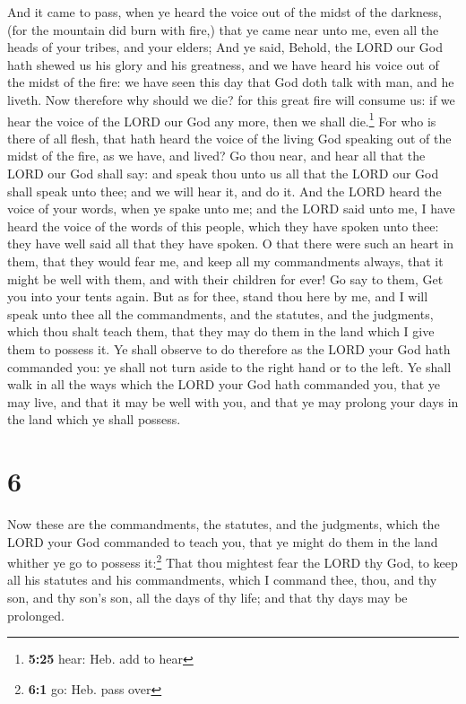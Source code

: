  And it came to pass, when ye heard the voice out of the
midst of the darkness, (for the mountain did burn with fire,) that ye
came near unto me, even all the heads of your tribes, and your elders;
 And ye said, Behold, the LORD our God hath shewed us his
glory and his greatness, and we have heard his voice out of the midst of
the fire: we have seen this day that God doth talk with man, and he
liveth.  Now therefore why should we die? for this great
fire will consume us: if we hear the voice of the LORD our God any more,
then we shall die.\footnote{\textbf{5:25} hear: Heb. add to hear}
 For who is there of all flesh, that hath heard the voice
of the living God speaking out of the midst of the fire, as we have, and
lived?  Go thou near, and hear all that the LORD our God
shall say: and speak thou unto us all that the LORD our God shall speak
unto thee; and we will hear it, and do it.  And the LORD
heard the voice of your words, when ye spake unto me; and the LORD said
unto me, I have heard the voice of the words of this people, which they
have spoken unto thee: they have well said all that they have spoken.
 O that there were such an heart in them, that they would
fear me, and keep all my commandments always, that it might be well with
them, and with their children for ever!  Go say to them,
Get you into your tents again.  But as for thee, stand
thou here by me, and I will speak unto thee all the commandments, and
the statutes, and the judgments, which thou shalt teach them, that they
may do them in the land which I give them to possess it. 
Ye shall observe to do therefore as the LORD your God hath commanded
you: ye shall not turn aside to the right hand or to the left.
 Ye shall walk in all the ways which the LORD your God
hath commanded you, that ye may live, and that it may be well with you,
and that ye may prolong your days in the land which ye shall possess.

\hypertarget{section-5}{%
\section{6}\label{section-5}}

 Now these are the commandments, the statutes, and the
judgments, which the LORD your God commanded to teach you, that ye might
do them in the land whither ye go to possess it:\footnote{\textbf{6:1}
  go: Heb. pass over}  That thou mightest fear the LORD
thy God, to keep all his statutes and his commandments, which I command
thee, thou, and thy son, and thy son's son, all the days of thy life;
and that thy days may be prolonged.

